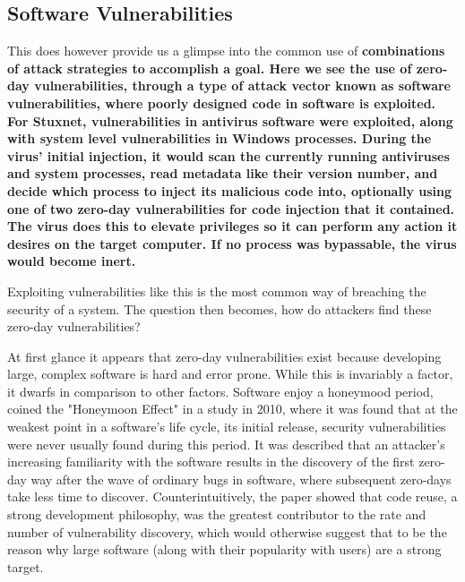 \documentclass[a4paper, 11pt]{article}
\begin{document}
\subsection{Software Vulnerabilities}
\label{sec:softwarevul}
This does however provide us a glimpse into the common use of \bfseries combinations \mdseries of attack strategies to accomplish a goal. Here we see the use of zero-day vulnerabilities, through a type of attack vector known as software vulnerabilities, where poorly designed code in software is exploited. \cite{ref:singer2014cybersecurity} For Stuxnet, vulnerabilities in antivirus software were exploited, along with system level vulnerabilities in Windows processes. During the virus' initial injection, it would scan the currently running antiviruses and system processes, read metadata like their version number, and decide which process to inject its malicious code into, optionally using one of two zero-day vulnerabilities for code injection that it contained. \cite{ref:stuxnet2011report} The virus does this to elevate privileges so it can perform any action it desires on the target computer. \cite{ref:stuxnet2011report} If no process was bypassable, the virus would become inert. \cite{ref:stuxnet2011report}

Exploiting vulnerabilities like this is the most common way of breaching the security of a system. \cite{ref:biometricattackvectors,ref:ibmbiometrics,ref:honeymoonsoftware} The question then becomes, how do attackers find these zero-day vulnerabilities?

At first glance it appears that zero-day vulnerabilities exist because developing large, complex software is hard and error prone. While this is invariably a factor, it dwarfs in comparison to other factors. Software enjoy a honeymood period, \cite{ref:honeymoonsoftware} coined the "Honeymoon Effect" in a study in 2010, where it was found that at the weakest point in a software's life cycle, its initial release, security vulnerabilities were never usually found during this period. It was described that an attacker's increasing familiarity with the software results in the discovery of the first zero-day way after the wave of ordinary bugs in software, where subsequent zero-days take less time to discover. Counterintuitively, the paper showed that code reuse, a strong development philosophy, was the greatest contributor to the rate and number of vulnerability discovery, which would otherwise suggest that to be the reason why large software (along with their popularity with users) are a strong target.
\end{document}
